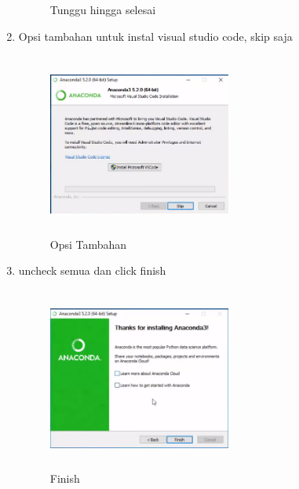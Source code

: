 \begin{enumerate}
\begin{figure}[H]
\caption{Tunggu hingga selesai}
\label{akhir}
\end{figure}
\item Opsi tambahan untuk instal visual studio code, skip saja
\begin{figure}[H]
\centering
\includegraphics[width=6cm,height=6cm]{figures/gambar7.png}
\caption{Opsi Tambahan}
\label{akhir}
\end{figure}
\item uncheck semua dan click finish
\begin{figure}[H]
\centering
\includegraphics[width=6cm,height=6cm]{figures/gambar8.png}
\caption{Finish}
\label{akhir}
\end{figure}
\end{enumerate}

